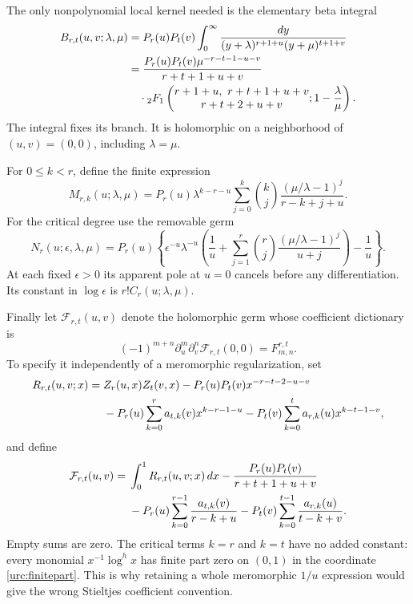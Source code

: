 The only nonpolynomial local kernel needed is the elementary beta
integral
\begin{align}
 B_{r,t}(u,v;\lambda,\mu)
 &=P_r(u)P_t(v)\int_0^\infty
 \frac{dy}{(y+\lambda)^{r+1+u}(y+\mu)^{t+1+v}}\notag\\
 &=\frac{P_r(u)P_t(v)\mu^{-r-t-1-u-v}}{r+t+1+u+v}\notag\\
 &\quad\cdot{}_2F_1\left(
 \begin{matrix}r+1+u,\ r+t+1+u+v\\r+t+2+u+v\end{matrix};
                   1-\frac\lambda\mu\right).
 \label{urc:beta-kernel}
\end{align}
The integral fixes its branch. It is holomorphic on a neighborhood
of $(u,v)=(0,0)$, including $\lambda=\mu$.

For $0\le k<r$, define the finite expression
\begin{equation}\label{urc:mixed-kernel}
 M_{r,k}(u;\lambda,\mu)
 =P_r(u)\lambda^{k-r-u}
  \sum_{j=0}^k\binom kj
      \frac{(\mu/\lambda-1)^j}{r-k+j+u}.
\end{equation}
For the critical degree use the removable germ
\begin{equation}\label{urc:critical-kernel}
 N_r(u;\epsilon,\lambda,\mu)
 =P_r(u)\left\{
 \epsilon^{-u}\lambda^{-u}
 \left(\frac1u+\sum_{j=1}^r\binom rj
                  \frac{(\mu/\lambda-1)^j}{u+j}\right)
 -\frac1u\right\}.
\end{equation}
At each fixed $\epsilon>0$ its apparent pole at $u=0$ cancels
before any differentiation. Its constant in $\log\epsilon$ is
$r!C_r(u;\lambda,\mu)$.

Finally let $\mathcal F_{r,t}(u,v)$ denote the holomorphic germ whose
coefficient dictionary is
\begin{equation}\label{urc:fp-germ}
 (-1)^{m+n}\partial_u^m\partial_v^n
          \mathcal F_{r,t}(0,0)=F_{m,n}^{r,t}.
\end{equation}
To specify it independently of a meromorphic regularization, set
\begin{align}
 R_{r,t}(u,v;x)={}&Z_r(u,x)Z_t(v,x)
 -P_r(u)P_t(v)x^{-r-t-2-u-v}\notag\\
 &-P_r(u)\sum_{k=0}^r a_{t,k}(v)x^{k-r-1-u}
 -P_t(v)\sum_{k=0}^t a_{r,k}(u)x^{k-t-1-v},
 \label{urc:remainder}
\end{align}
and define
\begin{align}
 \mathcal F_{r,t}(u,v)={}&\int_0^1R_{r,t}(u,v;x)\,dx
 -\frac{P_r(u)P_t(v)}{r+t+1+u+v}\notag\\
 &-P_r(u)\sum_{k=0}^{r-1}\frac{a_{t,k}(v)}{r-k+u}
 -P_t(v)\sum_{k=0}^{t-1}\frac{a_{r,k}(u)}{t-k+v}.
 \label{urc:fp-germ-construction}
\end{align}
Empty sums are zero. The critical terms $k=r$ and $k=t$ have no
added constant: every monomial $x^{-1}\log^h x$ has finite part
zero on $(0,1)$ in the coordinate \eqref{urc:finitepart}. This is
why retaining a whole meromorphic $1/u$ expression would give the
wrong Stieltjes coefficient convention.

